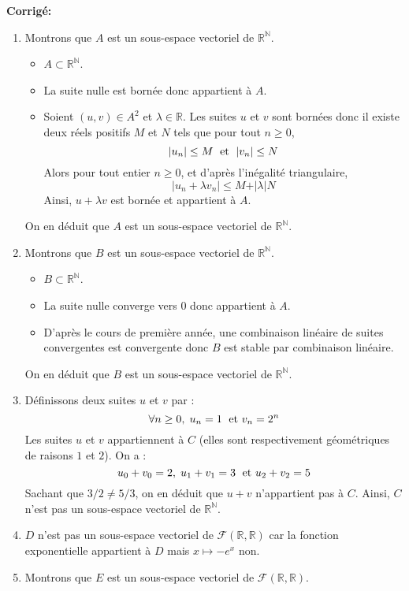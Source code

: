 \documentclass[a4paper,twoside,french,10pt]{VcCours}
\newcommand{\corr}{\textbf{Corrigé:}}
\begin{document}
\corr 

\begin{enumerate}
\item Montrons que $A$ est un sous-espace vectoriel de $\mathbb{R}^{\mathbb{N}}$.
\begin{itemize}
\item $A \subset \mathbb{R}^{\mathbb{N}}$.
\item La suite nulle est bornée donc appartient à $A$.
\item Soient $(u,v) \in A^2$ et $\lambda \in \mathbb{R}$. Les suites $u$ et $v$ sont bornées donc il existe deux réels positifs $M$ et $N$ tels que pour tout $n \geq 0$,
$$ \vert u_n \vert \leq M \; \hbox{ et } \; \vert v_n \vert \leq N$$
Alors pour tout entier $n \geq 0$, et d'après l'inégalité triangulaire,
$$ \vert u_n + \lambda v_n \vert \leq M+ \vert \lambda \vert N$$
Ainsi, $u+ \lambda v$ est bornée et appartient à $A$.
\end{itemize}
On en déduit que $A$ est un sous-espace vectoriel de $\mathbb{R}^{\mathbb{N}}$.
\item Montrons que $B$ est un sous-espace vectoriel de $\mathbb{R}^{\mathbb{N}}$.
\begin{itemize}
\item $B \subset \mathbb{R}^{\mathbb{N}}$.
\item La suite nulle converge vers $0$ donc appartient à $A$.
\item D'après le cours de première année, une combinaison linéaire de suites convergentes est convergente donc $B$ est stable par combinaison linéaire.
\end{itemize}
On en déduit que $B$ est un sous-espace vectoriel de $\mathbb{R}^{\mathbb{N}}$.
\item Définissons deux suites $u$ et $v$ par :
$$ \forall n \geq 0, \; u_n = 1 \; \hbox{ et } v_n = 2^n$$
Les suites $u$ et $v$ appartiennent à $C$ (elles sont respectivement géométriques de raisons $1$ et $2$). On a :
$$ u_0+v_0 = 2, \; u_1+v_1 = 3 \; \hbox{ et } u_2+v_2 = 5$$
Sachant que $3/2 \neq 5/3$, on en déduit que $u+v$ n'appartient pas à $C$. Ainsi, $C$ n'est pas un sous-espace vectoriel de $\mathbb{R}^{\mathbb{N}}$.
\item $D$ n'est pas un sous-espace vectoriel de $\mathcal{F}(\mathbb{R}, \mathbb{R})$ car la fonction exponentielle appartient à $D$ mais $x \mapsto -e^x$ non.
\item Montrons que $E$ est un sous-espace vectoriel de $\mathcal{F}(\mathbb{R}, \mathbb{R})$.
\begin{itemize}

\end{itemize}
\end{enumerate}
\end{document}
